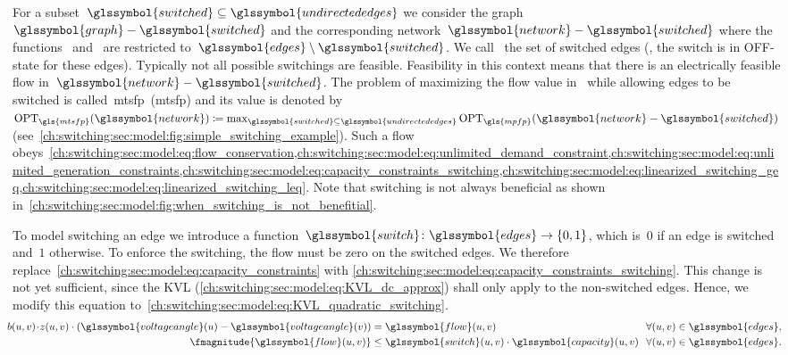 For a subset~$\glssymbol{switched}\subseteq\glssymbol{undirectededges}$ we
consider the graph~$\glssymbol{graph}-\glssymbol{switched}$ and the
corresponding network~$\glssymbol{network}-\glssymbol{switched}$ where the
functions~ and~ are restricted
to~$\glssymbol{edges}\setminus\glssymbol{switched}$.
%
We call~ the set of switched edges (\ie, the switch is in
OFF-state for these edges). Typically not all possible switchings are feasible.
Feasibility in this context means that there is an electrically feasible flow
in~$\glssymbol{network}-\glssymbol{switched}$.
%
%
The problem of maximizing the flow value in~ while allowing
edges to be switched is called~\acrlong{mtsfp}~(\gls{mtsfp}) and its value is
denoted by~$\opt_{\gls{mtsfp}}(\glssymbol{network})
\coloneqq
% 
\max_{\glssymbol{switched}\subseteq\glssymbol{undirectededges}}
\opt_{\gls{mpfp}}(\glssymbol{network}-\glssymbol{switched})$ (see~\cref{ch:switching:sec:model:fig:simple_switching_example}). Such a flow
% 
obeys~\cref{ch:switching:sec:model:eq:flow_conservation,ch:switching:sec:model:eq:unlimited_demand_constraint,ch:switching:sec:model:eq:unlimited_generation_constraints,ch:switching:sec:model:eq:capacity_constraints_switching,ch:switching:sec:model:eq:linearized_switching_geq,ch:switching:sec:model:eq:linearized_switching_leq}. 
% 
Note that switching is not always beneficial as shown in~\cref{ch:switching:sec:model:fig:when_switching_is_not_benefitial}.
%
\begingroup
    
    \label{ch:switching:problems:MTSF-Optimization_problem}
\endgroup
%
To model switching an edge we introduce a
function~$\glssymbol{switch}\colon\glssymbol{edges}\to\{0,1\}$, which is~$0$ if
an edge is switched and~$1$ otherwise.
%
To enforce the switching, the flow must be zero on the switched edges. We
therefore replace~\cref{ch:switching:sec:model:eq:capacity_constraints} with
\cref{ch:switching:sec:model:eq:capacity_constraints_switching}. This change is
not yet sufficient, since the KVL
(\cref{ch:switching:sec:model:eq:KVL_dc_approx}) shall only apply to the
non-switched edges. Hence, we modify this equation 
to~\cref{ch:switching:sec:model:eq:KVL_quadratic_switching}.%
%
\begin{align}%
    \hspace*{-2.5mm}b(\vertexa,\vertexb)\!\cdot\! \switch(\vertexa,\vertexb)\cdot 
    (\glssymbol{voltageangle}
    (\vertexa) - \glssymbol{voltageangle}(\vertexb))
    &= \glssymbol{flow}(\vertexa,\vertexb) &\forall 
    (\vertexa,\vertexb)\in\glssymbol{edges},\hspace*{-1mm}
    \label{ch:switching:sec:model:eq:KVL_quadratic_switching}\\%
    \fmagnitude{\glssymbol{flow}(\vertexa,\vertexb)}&\leq 
    \glssymbol{switch}(\vertexa,\vertexb)\cdot
    \glssymbol{capacity}(\vertexa,\vertexb)
    \hspace*{-1mm} &
    \forall(\vertexa,\vertexb)\in\glssymbol{edges}.\hspace*{-1mm}
    \label{ch:switching:sec:model:eq:capacity_constraints_switching}%
\end{align}%
